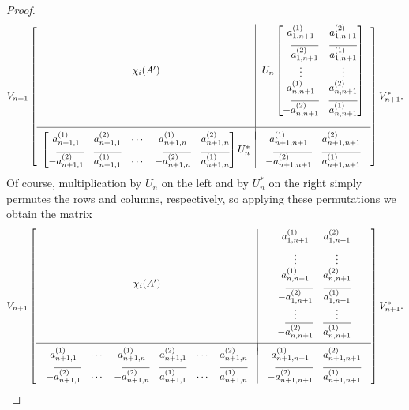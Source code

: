 \documentclass[10pt,a4paper]{amsart}
\def\x{\chi}
\begin{document}
\begin{proof}
    \[
        V_{n+1} \left[\begin{array}{c|c} \x_i(A') & U_n \begin{bmatrix}a_{1,n+1}^{(1)} & a_{1,n+1}^{(2)} \\[6pt] -\overline{a_{1,n+1}^{(2)}} & \overline{a_{1,n+1}^{(1)}} \\ \vdots & \vdots \\ a_{n,n+1}^{(1)} & a_{n,n+1}^{(2)} \\[6pt] -\overline{a_{n,n+1}^{(2)}} & \overline{a_{n,n+1}^{(1)}} \end{bmatrix} \\[50pt] \hline \\[-8pt] \begin{bmatrix}a_{n+1,1}^{(1)} & a_{n+1,1}^{(2)} & \cdots & a_{n+1,n}^{(1)} & a_{n+1,n}^{(2)} \\[6pt] -\overline{a_{n+1,1}^{(2)}} & \overline{a_{n+1,1}^{(1)}} & \cdots & -\overline{a_{n+1,n}^{(2)}} & \overline{a_{n+1,n}^{(1)}}\end{bmatrix} U_n^* & \begin{array}{cc} a_{n+1,n+1}^{(1)} & a_{n+1,n+1}^{(2)} \\[6pt] -\overline{a_{n+1,n+1}^{(2)}} & \overline{a_{n+1, n+1}^{(1)}}\end{array} \end{array}\right] V_{n+1}^*.
    \]
    Of course, multiplication by \(U_n\) on the left and by \(U_n^*\) on the right simply permutes the rows and columns, respectively, so applying these permutations we obtain the matrix
    \[
        V_{n+1} \left[\begin{array}{c|c} \x_i(A') & \begin{array}{cc} a_{1,n+1}^{(1)} & a_{1,n+1}^{(2)} \\[6pt] \vdots & \vdots \\ a_{n,n+1}^{(1)} & a_{n,n+1}^{(2)} \\[6pt] -\overline{a_{1,n+1}^{(2)}} & \overline{a_{1,n+1}^{(1)}} \\ \vdots & \vdots \\ -\overline{a_{n,n+1}^{(2)}} & \overline{a_{n,n+1}^{(1)}} \end{array} \\[10pt] \\[-8pt] \hline \\[-8pt] \begin{array}{cccccc} a_{n+1,1}^{(1)} & \cdots &  a_{n+1,n}^{(1)} & a_{n+1,1}^{(2)} & \cdots & a_{n+1,n}^{(2)} \\[6pt] -\overline{a_{n+1,1}^{(2)}} & \cdots & -\overline{a_{n+1,n}^{(2)}} & \overline{a_{n+1,1}^{(1)}} & \cdots & \overline{a_{n+1,n}^{(1)}}\end{array} & \begin{array}{cc} a_{n+1,n+1}^{(1)} & a_{n+1,n+1}^{(2)} \\[6pt] -\overline{a_{n+1,n+1}^{(2)}} & \overline{a_{n+1, n+1}^{(1)}}\end{array} \end{array}\right] V_{n+1}^*.
    \]


\end{proof}
\end{document}
